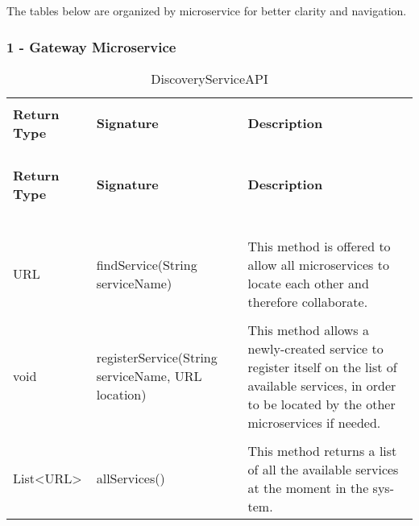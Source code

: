 The tables below are organized by microservice for better clarity and navigation.

\subsubsection{1 - Gateway Microservice}

\begin{longtable}{p{}p{}p{}}
    \caption{DiscoveryServiceAPI}
    \vspace{0.5em}\\
    \hline
    \vspace{0.5em}\\
    \textbf{Return Type} & \textbf{Signature} & \textbf{Description} \\
    \vspace{0.5em}\\
    \hline
    \vspace{0.5em}\\
    \endfirsthead
    \vspace{0.5em}\\
    \hline
    \vspace{0.5em}\\
    \textbf{Return Type} & \textbf{Signature} & \textbf{Description} \\
    \vspace{0.5em}\\
    \hline
    \vspace{0.5em}\\
    \endhead
    
    \vspace{0.5em}\\
    \hline
    \vspace{0.5em}\\
    \endfoot
    
    \vspace{0.5em}\\
    \hline
    \vspace{0.5em}\\
    \endlastfoot
    
    URL &
    findService(String serviceName) &
    This method is offered
    to allow all microservices
    to locate each other and
    therefore collaborate. \\
    \vspace{0.5em}\\
    void &
    registerService(String serviceName, URL location) &
    This method allows a
    newly-created service to
    register itself on the list of
    available services, in order
    to be located by the other
    microservices if needed. \\
    \vspace{0.5em}\\
    List<URL> &
    allServices() &
    This method returns a list
    of all the available services
    at the moment in the sys-
    tem. \\

\end{longtable}


